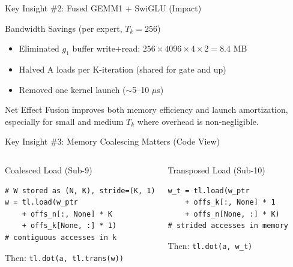 \documentclass[aspectratio=169,11pt]{beamer}
\begin{document}
\begin{frame}[t]{Key Insight \#2: Fused GEMM1 + SwiGLU (Impact)}
\small
\begin{block}{Bandwidth Savings (per expert, $T_k = 256$)}
\begin{itemize}
    \item Eliminated $g_1$ buffer write+read: $256 \times 4096 \times 4 \times 2 = 8.4$ MB
    \item Halved A loads per K-iteration (shared for gate and up)
    \item Removed one kernel launch ($\sim$5--10 $\mu$s)
\end{itemize}
\end{block}

\begin{exampleblock}{Net Effect}
Fusion improves both memory efficiency and launch amortization, especially for small and medium $T_k$ where overhead is non-negligible.
\end{exampleblock}
\end{frame}

\begin{frame}[fragile,t]{Key Insight \#3: Memory Coalescing Matters (Code View)}
\small
\begin{columns}[T]
\begin{exampleblock}{Coalesced Load (Sub-9)}
\begin{lstlisting}[basicstyle=\ttfamily\scriptsize]
# W stored as (N, K), stride=(K, 1)
w = tl.load(w_ptr
    + offs_n[:, None] * K
    + offs_k[None, :] * 1)
# contiguous accesses in k
\end{lstlisting}
Then: \texttt{tl.dot(a, tl.trans(w))}
\end{exampleblock}

\begin{alertblock}{Transposed Load (Sub-10)}
\begin{lstlisting}[basicstyle=\ttfamily\scriptsize]
w_t = tl.load(w_ptr
    + offs_k[:, None] * 1
    + offs_n[None, :] * K)
# strided accesses in memory
\end{lstlisting}
Then: \texttt{tl.dot(a, w\_t)}
\end{alertblock}
\end{columns}
\end{frame}
\end{document}
